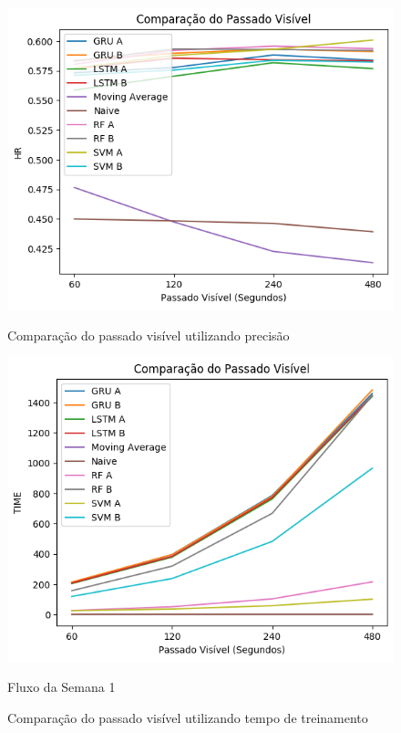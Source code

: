 \begin{figure}[htbp]
    \centering
    \includegraphics[scale=0.8]{monography/img/comparisons/comparacao_do_passado_visivel_hr.png}
    \label{figure:passado_visivel_hr}
    \caption{Comparação do passado visível utilizando precisão}
\end{figure}

\begin{figure}[htbp]
    \centering
    \includegraphics[scale=0.8]{monography/img/comparisons/comparacao_do_passado_visivel_time.png}
    \label{figure:passado_visivel_time}
    \caption{Fluxo da Semana 1}
    \caption{Comparação do passado visível utilizando tempo de treinamento}
\end{figure}

